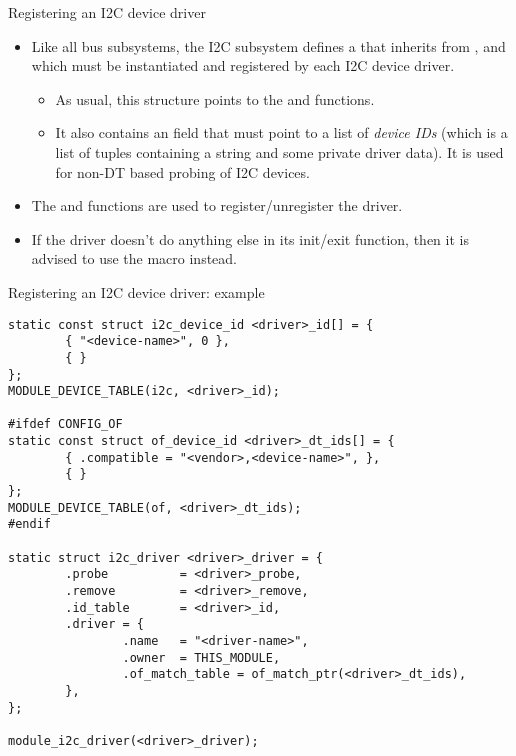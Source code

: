 \begin{frame}{Registering an I2C device driver}
  \begin{itemize}
  \item Like all bus subsystems, the I2C subsystem defines a
     that inherits from
    , and which must be instantiated and
    registered by each I2C device driver.
    \begin{itemize}
    \item As usual, this structure points to the  and
       functions.
    \item It also contains an  field that must point to a
      list of {\em device IDs} (which is a list of tuples containing a
      string and some private driver data). It is used for non-DT based
      probing of I2C devices.
    \end{itemize}
  \item The  and  functions
    are used to register/unregister the driver.
  \item If the driver doesn't do anything else in its init/exit
    function, then it is advised to use the 
    macro instead.
  \end{itemize}
\end{frame}

\begin{frame}[fragile]{Registering an I2C device driver: example}
  \begin{block}{}
  \begin{verbatim}
static const struct i2c_device_id <driver>_id[] = {
        { "<device-name>", 0 },
        { }
};
MODULE_DEVICE_TABLE(i2c, <driver>_id);

#ifdef CONFIG_OF
static const struct of_device_id <driver>_dt_ids[] = {
        { .compatible = "<vendor>,<device-name>", },
        { }
};
MODULE_DEVICE_TABLE(of, <driver>_dt_ids);
#endif

static struct i2c_driver <driver>_driver = {
        .probe          = <driver>_probe,
        .remove         = <driver>_remove,
        .id_table       = <driver>_id,
        .driver = {
                .name   = "<driver-name>",
                .owner  = THIS_MODULE,
                .of_match_table = of_match_ptr(<driver>_dt_ids),
        },
};

module_i2c_driver(<driver>_driver);
\end{verbatim}
\end{block}
\end{frame}

